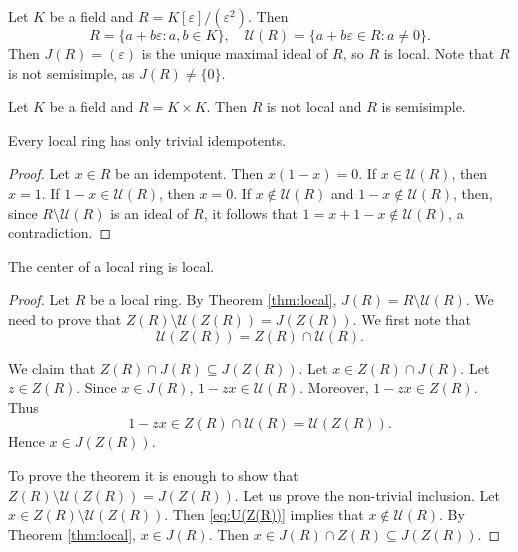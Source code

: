 \begin{example}
    Let $K$ be a field and 
    $R=K[\varepsilon]/(\varepsilon^2)$. Then
    \[
    R=\{a+b\varepsilon:a,b\in K\},\quad 
    \mathcal{U}(R)=\{a+b\varepsilon\in R:a\ne0\}.
    \]
    Then $J(R)=(\varepsilon)$ is the unique maximal 
    ideal of $R$, so $R$ is local. Note that 
    $R$ is not semisimple, as $J(R)\ne\{0\}$. 
\end{example}

\begin{example}
   Let $K$ be a field and $R=K\times K$. 
   Then $R$ is not local and $R$ is semisimple.  
\end{example}

\begin{proposition}
\label{pro:local=>trivial_idempotents}
    Every local ring has only trivial idempotents.
\end{proposition}

\begin{proof}
    Let $x\in R$ be an idempotent. Then $x(1-x)=0$. If $x\in\mathcal{U}(R)$, then 
    $x=1$. If $1-x\in\mathcal{U}(R)$, then $x=0$. If $x\not\in \mathcal{U}(R)$ and $1-x\not\in\mathcal{U}(R)$, 
    then, since $R\setminus\mathcal{U}(R)$ is an ideal of $R$, 
    it follows that 
    $1=x+1-x\not\in\mathcal{U}(R)$, a contradiction. 
\end{proof}

\begin{theorem}
    The center of a local ring is local. 
\end{theorem}

\begin{proof}
    Let $R$ be a local ring. By Theorem \ref{thm:local}, $J(R)=R\setminus\mathcal{U}(R)$.  
    We need to prove that $Z(R)\setminus\mathcal{U}(Z(R))=J(Z(R))$. 
    We first note that
    \begin{equation}
    \label{eq:U(Z(R))}
        \mathcal{U}(Z(R))=Z(R)\cap\mathcal{U}(R).
    \end{equation}
    
    We claim that $Z(R)\cap J(R)\subseteq J(Z(R))$.  
    Let $x\in Z(R)\cap J(R)$. Let $z\in Z(R)$. Since $x\in J(R)$, $1-zx\in\mathcal{U}(R)$.
    Moreover, $1-zx\in Z(R)$. Thus 
    \[
    1-zx\in Z(R)\cap\mathcal{U}(R)=\mathcal{U}(Z(R)).
    \]
    Hence $x\in J(Z(R))$. 

    To prove the theorem it is enough to show that 
    $Z(R)\setminus\mathcal{U}(Z(R))=J(Z(R))$. Let us prove the non-trivial inclusion. 
    Let $x\in Z(R)\setminus\mathcal{U}(Z(R))$.  Then 
    \eqref{eq:U(Z(R))} implies that 
    $x\not\in\mathcal{U}(R)$. 
    By Theorem \ref{thm:local}, 
    $x\in J(R)$. Then $x\in J(R)\cap Z(R)\subseteq J(Z(R))$. 
\end{proof}

